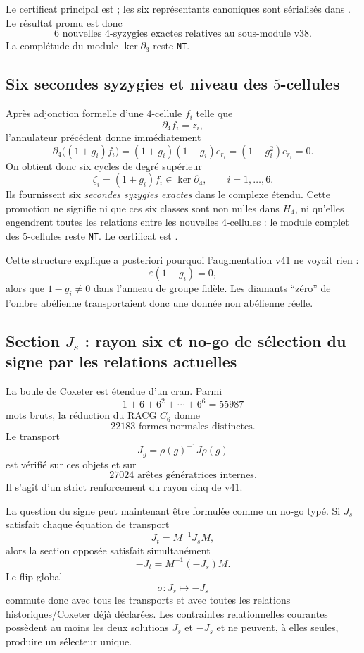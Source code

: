 \documentclass[11pt,a4paper]{article}
\newcommand{\certNT}{\texttt{NT}}
\begin{document}
Le certificat principal est ; les six représentants canoniques sont sérialisés dans . Le résultat promu est donc
\[
 \boxed{6\text{ nouvelles }4\text{-syzygies exactes relatives au sous-module v38}.}
\]
La complétude du module $\ker\partial_3$ reste \certNT.

\subsection{Six secondes syzygies et niveau des $5$-cellules}

Après adjonction formelle d'une $4$-cellule $f_i$ telle que
\[
 \partial_4f_i=z_i,
\]
l'annulateur précédent donne immédiatement
\[
 \partial_4\bigl((1+g_i)f_i\bigr)
 =(1+g_i)(1-g_i)e_{r_i}
 =(1-g_i^2)e_{r_i}=0.
\]
On obtient donc six cycles de degré supérieur
\[
 \boxed{\zeta_i=(1+g_i)f_i\in\ker\partial_4,
 \qquad i=1,\ldots,6.}
\]
Ils fournissent six \emph{secondes syzygies exactes} dans le complexe étendu. Cette promotion ne signifie ni que ces six classes sont non nulles dans $H_4$, ni qu'elles engendrent toutes les relations entre les nouvelles $4$-cellules : le module complet des $5$-cellules reste \certNT. Le certificat est .

Cette structure explique a posteriori pourquoi l'augmentation v41 ne voyait rien :
\[
 \varepsilon(1-g_i)=0,
\]
alors que $1-g_i\neq0$ dans l'anneau de groupe fidèle. Les diamants ``zéro'' de l'ombre abélienne transportaient donc une donnée non abélienne réelle.

\subsection{Section $J_s$ : rayon six et no-go de sélection du signe par les relations actuelles}

La boule de Coxeter est étendue d'un cran. Parmi
\[
 1+6+6^2+\cdots+6^6=55987
\]
mots bruts, la réduction du RACG $C_6$ donne
\[
 \boxed{22183\text{ formes normales distinctes}.}
\]
Le transport
\[
 J_g=\rho(g)^{-1}J\rho(g)
\]
est vérifié sur ces objets et sur
\[
 \boxed{27024\text{ arêtes génératrices internes}.}
\]
Il s'agit d'un strict renforcement du rayon cinq de v41.

La question du signe peut maintenant être formulée comme un no-go typé. Si $J_s$ satisfait chaque équation de transport
\[
 J_t=M^{-1}J_sM,
\]
alors la section opposée satisfait simultanément
\[
 -J_t=M^{-1}(-J_s)M.
\]
Le flip global
\[
 \sigma:J_s\longmapsto-J_s
\]
commute donc avec tous les transports et avec toutes les relations historiques/Coxeter déjà déclarées. Les contraintes relationnelles courantes possèdent au moins les deux solutions $J_s$ et $-J_s$ et ne peuvent, à elles seules, produire un sélecteur unique.
\end{document}
